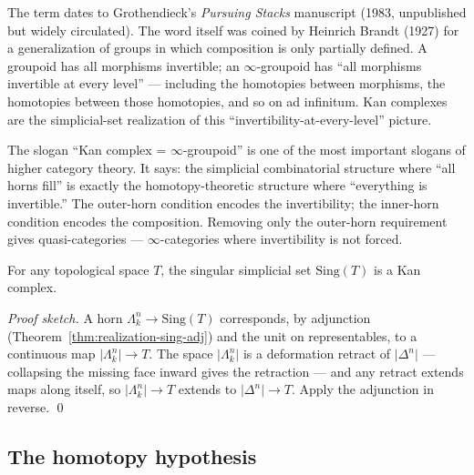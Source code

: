 \begin{nameorigin}
The term  dates to Grothendieck's \emph{Pursuing
Stacks} manuscript (1983, unpublished but widely circulated). The word
 itself was coined by Heinrich Brandt (1927) for a
generalization of groups in which composition is only partially defined.
A groupoid has all morphisms invertible; an $\infty$-groupoid has
``all morphisms invertible at every level'' — including the homotopies
between morphisms, the homotopies between those homotopies, and so on
ad infinitum. Kan complexes are the simplicial-set realization of this
``invertibility-at-every-level'' picture.
\end{nameorigin}

\begin{readernote}
The slogan ``Kan complex = $\infty$-groupoid'' is one of the most
important slogans of higher category theory. It says: the simplicial
combinatorial structure where ``all horns fill'' is exactly the
homotopy-theoretic structure where ``everything is invertible.'' The
outer-horn condition encodes the invertibility; the inner-horn condition
encodes the composition. Removing only the outer-horn requirement gives
quasi-categories — $\infty$-categories where invertibility is not forced.
\end{readernote}

\begin{theorem}
\label{thm:sing-kan}
For any topological space $T$, the singular simplicial set
$\mathrm{Sing}(T)$ is a Kan complex.
\end{theorem}

\begin{proof}[Proof sketch]
A horn $\Lambda^n_k \to \mathrm{Sing}(T)$ corresponds, by adjunction
(Theorem~\ref{thm:realization-sing-adj}) and the unit on representables,
to a continuous map $\lvert\Lambda^n_k\rvert \to T$. The space
$\lvert\Lambda^n_k\rvert$ is a deformation retract of
$\lvert\Delta^n\rvert$ — collapsing the missing face inward gives the
retraction — and any retract extends maps along itself, so
$\lvert\Lambda^n_k\rvert \to T$ extends to $\lvert\Delta^n\rvert \to T$.
Apply the adjunction in reverse.
\qed
\end{proof}

\subsection{The homotopy hypothesis}
\label{sec:homotopy-hypothesis}


